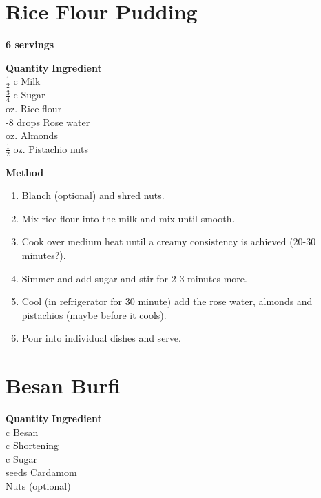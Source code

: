 \section{Rice Flour Pudding }
{\bf 6 servings}

\begin{tabbing}
\hspace{1.0cm}  \={\bf Quantity}   \hspace{3.0cm} \={\bf Ingredient}\\

 $\frac{1}{2}$ c\> Milk\\
\>$\frac{3}{4}$ c \>Sugar\\
 oz. \>Rice flour\\
-8 drops \>Rose water\\
 oz. \>Almonds\\
\>$\frac{1}{2}$ oz. \>Pistachio nuts\\
\end{tabbing}

{\bf Method}
\begin{enumerate}
\item  Blanch (optional) and shred nuts.
\item  Mix rice flour into the milk and mix until smooth.
\item Cook over medium heat until a creamy consistency is achieved (20-30 minutes?).
\item Simmer and add sugar and stir for 2-3 minutes more.
\item Cool (in refrigerator for 30 minute) add the rose water, almonds and
pistachios  (maybe before it cools).
\item Pour into individual dishes and serve.
\end{enumerate}

\section{Besan Burfi}

\begin{tabbing}
\hspace{1.0cm}  \={\bf Quantity}   \hspace{3.0cm} \={\bf Ingredient}\\
 c \>Besan\\
 c \>Shortening\\
 c \>Sugar\\
 seeds \>Cardamom\\
\>\>Nuts (optional)\\
\end{tabbing}

